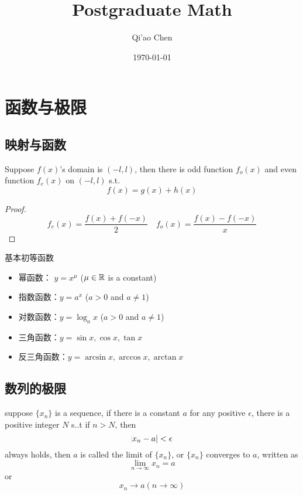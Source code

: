 \documentclass[11pt]{article}
\author{Qi'ao Chen}
\date{\today}
\title{Postgraduate Math}
\begin{document}
\maketitle
\tableofcontents \clearpage
\section{函数与极限}
\label{sec:orga117e8a}
\subsection{映射与函数}
\label{sec:orga4f7a06}
\begin{proposition}[]
Suppose \(f(x)\)'s domain is \((-l,l)\), then there is odd function
\(f_o(x)\) and even function \(f_e(x)\) on \((-l,l)\) s.t.
\begin{equation*}
f(x)=g(x)+h(x)
\end{equation*}
\end{proposition}

\begin{proof}
\begin{equation*}
f_e(x)=\frac{f(x)+f(-x)}{2}\quad
f_o(x)=\frac{f(x)-f(-x)}{x}
\end{equation*}
\end{proof}

基本初等函数
\begin{itemize}
\item 幂函数： \(y=x^\mu\) (\(\mu\in\mathbb{R}\) is a constant)
\item 指数函数：\(y=a^x\) (\(a\iffalse<\fi>0\) and \(a\neq1\))
\item 对数函数：\(y=\log_ax\) (\(a>0\) and \(a\neq1\))
\item 三角函数：\(y=\sin x,\cos x,\tan x\)
\item 反三角函数：\(y=\arcsin x,\arccos x,\arctan x\)
\end{itemize}
\subsection{数列的极限}
\label{sec:org16c4bb5}
\begin{definition}[]
suppose \(\{x_n\}\) is a sequence, if there is a constant \(a\) for any
positive \(\epsilon\), there is a positive integer \(N\) s..t if \(n>N\), then
\begin{equation*}
\abs{x_n-a}<\epsilon
\end{equation*}
always holds, then \(a\) is called the limit of \(\{x_n\}\), or \(\{x_n\}\)
converges to \(a\), written as
\begin{equation*}
\lim_{n\to\infty}x_n=a
\end{equation*}
or
\begin{equation*}
x_n\to a(n\to \infty)
\end{equation*}
\end{definition}
\end{document}
